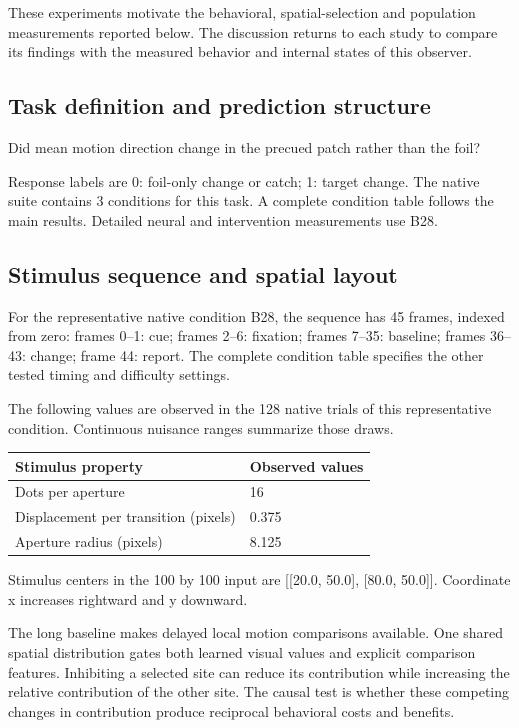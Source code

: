 \documentclass[11pt]{article}
\begin{document}
These experiments motivate the behavioral, spatial-selection and population measurements reported below. The discussion returns to each study to compare its findings with the measured behavior and internal states of this observer.
\subsection{Task definition and prediction structure}
Did mean motion direction change in the precued patch rather than the foil?

Response labels are 0: foil-only change or catch; 1: target change. The native suite contains 3 conditions for this task. A complete condition table follows the main results. Detailed neural and intervention measurements use B28.

\subsection{Stimulus sequence and spatial layout}
For the representative native condition B28, the sequence has 45 frames, indexed from zero: frames 0--1: cue; frames 2--6: fixation; frames 7--35: baseline; frames 36--43: change; frame 44: report. The complete condition table specifies the other tested timing and difficulty settings.

The following values are observed in the 128 native trials of this representative condition. Continuous nuisance ranges summarize those draws.
\begin{center}\small\begin{tabular}{p{}p{}}\toprule Stimulus property & Observed values\\\midrule
Dots per aperture & 16\\
Displacement per transition (pixels) & 0.375\\
Aperture radius (pixels) & 8.125\\
\bottomrule\end{tabular}\normalsize\end{center}
Stimulus centers in the 100 by 100 input are [[20.0, 50.0], [80.0, 50.0]]. Coordinate x increases rightward and y downward.

The long baseline makes delayed local motion comparisons available. One shared spatial distribution gates both learned visual values and explicit comparison features. Inhibiting a selected site can reduce its contribution while increasing the relative contribution of the other site. The causal test is whether these competing changes in contribution produce reciprocal behavioral costs and benefits.
\end{document}
